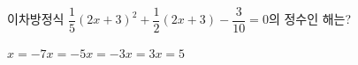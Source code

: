 이차방정식 $\dfrac{1}{5}(2x+3)^2+\dfrac{1}{2}(2x+3)-\dfrac{3}{10}=0$의 정수인 해는?
\begin{choices32}{$x=-7$}{$x=-5$}{$x=-3$}{$x=3$}{$x=5$}\end{choices32}
